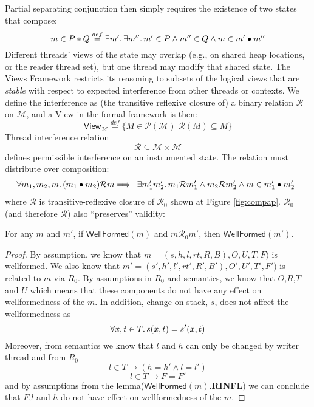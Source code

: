 Partial separating conjunction then simply requires the existence of two states that compose:
\[ m \in P \ast Q   \stackrel{def}{=} \exists m' \ldotp \exists m'' \ldotp m' \in P \land m'' \in Q \land m \in m' \bullet m''\]
Different threads' views of the state may overlap (e.g., on shared heap locations, or the reader thread set), but one thread may modify that shared state.  The Views Framework restricts its reasoning to subsets of the logical views that are \emph{stable} with respect to expected interference from other threads or contexts.  We define the interference as (the transitive reflexive closure of) a binary relation $\mathcal{R}$ on $\mathcal{M}$, and a \textsf{View} in the formal framework is then:
\[\textsf{View}_{\mathcal{M}} \stackrel{def}{=} \{ M \in \mathcal{P}(\mathcal{M}) | \mathcal{R}(M) \subseteq M\}\]
Thread interference relation
\[\mathcal{R} \subseteq \mathcal{M} \times \mathcal{M}\]  defines permissible interference on an instrumented state. The relation must distribute over composition:
\[ \forall m_{1}, m_{2}, m\ldotp (m_{1} \bullet  m_{2})\mathcal{R}m \Longrightarrow \begin{array}{ll}  \exists  m'_{1} m'_{2} \ldotp m_{1} \mathcal{R} m'_{1} \land m_{2} \mathcal{R} m'_{2} \land  m \in m'_{1} \bullet m'_{2} \end{array}\]
where $\mathcal{R}$ is transitive-reflexive closure of $\mathcal{R}_{0}$ shown at Figure \ref{fig:compap}. $\mathcal{R}_0$ (and therefore $\mathcal{R}$) also ``preserves'' validity:
\begin{lemma}\label{lem:interap}
For any $m$ and $m'$, if $\mathsf{WellFormed}(m)$ and $m\mathcal{R}_0m'$, then $\mathsf{WellFormed}(m')$.
\end{lemma}
\begin{proof}
  By assumption, we know that $m = (s,h,l,rt,R,B),O,U,T,F)$ is wellformed. We also know that $m'= (s',h',l',rt',R',B'),O',U',T',F')$ is related to $m$ via $R_{0}$. By assumptions in $R_{0}$ and semantics, we know that $O$,$R$,$T$ and $U$ which means that these components do not have any effect on wellformedness of the $m$. In addition, change on stack, $s$, does not affect the wellformedness as
\[\forall x,t \in T \ldotp s(x,t) = s'(x,t) \]
Moreover, from semantics we know that $l$ and $h$ can only be changed by writer thread and from $R_0$
\[l  \in  T \rightarrow (h = h' \land l=l')\]
\[  l\in T\rightarrow F=F'\]
and by assumptions from the lemma($\mathsf{WellFormed}(m)$.\textbf{RINFL}) we can conclude that $F$,$l$ and $h$ do not have effect on wellformedness of the $m$.
\end{proof}
